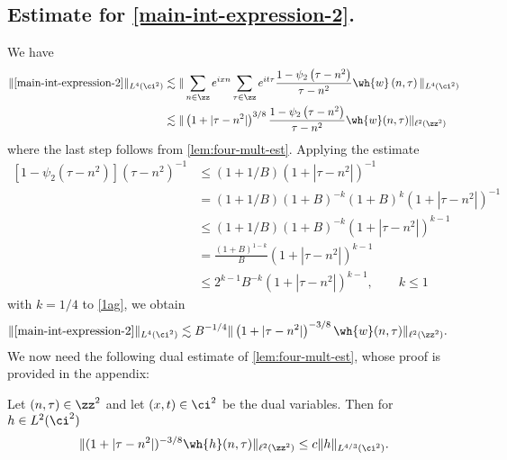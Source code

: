 \subsection{Estimate for \eqref{main-int-expression-2}.}
We have
%
%
\begin{equation}
	\label{1ag}
	\begin{split}
		\|\eqref{main-int-expression-2}\|_{L^4(\ci^2)} 
		& \lesssim \| \sum_{n \in \zz} e^{ixn} \sum_{\tau \in
		\zz} e^{it \tau} \frac{1- \psi_2\left( \tau - n^2 \right)}{\tau - 
		n^2} \wh{w}\left( n, \tau \right) \|_{L^4(\ci^2)}
		\\
		& \lesssim  \|\left( 1 + |\tau - n^2| \right)^{3/8}
		\frac{1- \psi_2\left( \tau - n^2 \right)}{\tau - 
		n^2} \wh{w}(n, \tau) \|_{\ell^2(\zz^2)}
	\end{split}
\end{equation}
%
%
where the last step follows from \cref{lem:four-mult-est}. Applying the 
estimate
%
%
\begin{equation}
	\label{2ag}
	\begin{split}
		\left[ 1 - \psi_2\left( \tau - n^2 \right) \right]
		\left( \tau - n^2 \right)^{-1}
		& \le \left( 1 + 1 /B \right)\left( 1 + |\tau - n^2| 
		\right)^{-1}
		\\
		& = \left( 1 + 1/B \right)\left( 1 + B \right)^{-k }
		\left( 1 + B \right)^k \left( 1 + |\tau - n^2| \right)^{-1} 
				\\
		& \le \left( 1 + 1/B \right)\left( 1 + B \right)^{-k 
		} \left( 1 + |\tau - n^2| \right)^{k-1}
		\\
		& = \frac{\left( 1 + B \right)^{1-k }}{B} \left( 1 + |\tau - 
		n^2|
		\right)^{k - 1}
		\\
		& \le 2^{k -1} B^{-k } \left( 1 + |\tau - n^2| \right)^{k - 1}, 
		\qquad k \le 1
	\end{split}
\end{equation}
%
%
with $k = 1/4$ to \eqref{1ag}, we obtain 
%
%
\begin{equation}
	\label{3ag}
	\begin{split}
		\|\eqref{main-int-expression-2}\|_{L^4(\ci^2)}
		& \lesssim  
		B^{-1/4} \|\left( 1 + |\tau - n^2| \right)^{-3/8} \wh{w} (n, 
		\tau) \|_{\ell^2(\zz^2)}.
	\end{split}
\end{equation}
%
%
We now need the following dual estimate of 
\cref{lem:four-mult-est}, whose proof is provided in the appendix:
%
%
\begin{corollary}
	\label{cor:four-mult-est-dual}
Let $(n, \tau) \in \zz^2$ and let  $(x, t) \in \ci^2$
be the dual variables. Then for $h \in L^2(\ci^2)$
%
%
\begin{equation}
	\label{four-mult-est-dual}
	\|(1 + |\tau - 
	n^2|)^{-3/8} \wh{h}(n, \tau) \|_{\ell^2(\zz^2)} \le 
	c \|h\|_{L^{4/3}(\ci^2)}.
\end{equation}
%
%
\end{corollary}
